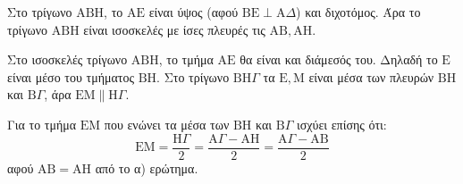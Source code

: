 \begin{alist}
    \item Στο τρίγωνο $\mathrm{A}\mathrm{B}\mathrm{H}$, το $\mathrm{A}\mathrm{E}$ είναι ύψος (αφού $\mathrm{B}\mathrm{E} \perp \mathrm{A}\Delta$) και διχοτόμος. Άρα το τρίγωνο $\mathrm{A}\mathrm{B}\mathrm{H}$ είναι ισοσκελές με ίσες πλευρές τις $\mathrm{A}\mathrm{B}, \mathrm{A}\mathrm{H}$.
    
    \item Στο ισοσκελές τρίγωνο $\mathrm{A}\mathrm{B}\mathrm{H}$, το τμήμα $\mathrm{A}\mathrm{E}$ θα είναι και διάμεσός του. Δηλαδή το $\mathrm{E}$ είναι μέσο του τμήματος $\mathrm{B}\mathrm{H}$. Στο τρίγωνο $\mathrm{B}\mathrm{H}\Gamma$ τα $\mathrm{E}, \mathrm{M}$ είναι μέσα των πλευρών $\mathrm{B}\mathrm{H}$ και $\mathrm{B}\Gamma$, άρα $\mathrm{E}\mathrm{M} \parallel \mathrm{H}\Gamma$.
    
    \item Για το τμήμα $\mathrm{E}\mathrm{M}$ που ενώνει τα μέσα των $\mathrm{B}\mathrm{H}$ και $\mathrm{B}\Gamma$ ισχύει επίσης ότι:
    \[ \mathrm{E}\mathrm{M} = \frac{\mathrm{H}\Gamma}{2} = \frac{\mathrm{A}\Gamma - \mathrm{A}\mathrm{H}}{2} = \frac{\mathrm{A}\Gamma - \mathrm{A}\mathrm{B}}{2} \]
    αφού $\mathrm{A}\mathrm{B} = \mathrm{A}\mathrm{H}$ από το α) ερώτημα.
\end{alist}
